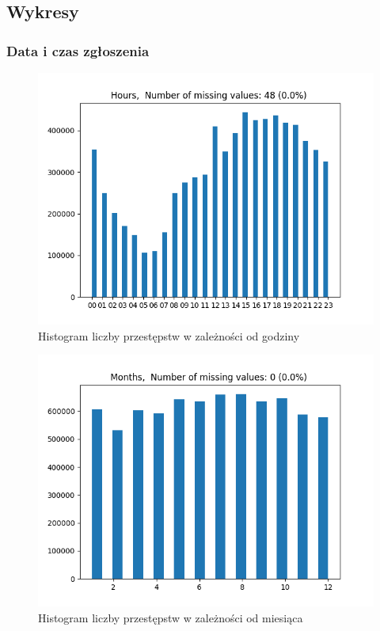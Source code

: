 \documentclass{classrep}
\begin{document}
{        \subsection{Wykresy} {

            \subsubsection{Data i czas zgłoszenia} {

                \begin{figure}[!htbp]
                    \centering
                    \includegraphics[width=\textwidth]{img/Hours-133549.png}
                    \caption{Histogram liczby przestępstw w zależności od godziny}
                    \label{hist_hours}
                \end{figure}
                \begin{figure}[!htbp]
                    \centering
                    \includegraphics[width=\textwidth]{img/Months-133554.png}
                    \caption{Histogram liczby przestępstw w zależności od miesiąca}
                    \label{hist_months}
                \end{figure}
                \FloatBarrier
                
}}}
\end{document}
